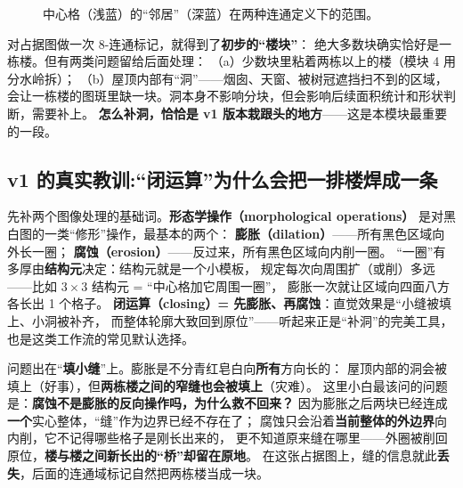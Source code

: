 \begin{figure}[H]
\centering
{}
\caption{中心格（浅蓝）的``邻居''（深蓝）在两种连通定义下的范围。}
\label{fig:conn}
\end{figure}

对占据图做一次 8-连通标记，就得到了\textbf{初步的``楼块''}：
绝大多数块确实恰好是一栋楼。但有两类问题留给后面处理：
（a）少数块里粘着两栋以上的楼（模块 4 用分水岭拆）；
（b）屋顶内部有``洞''——烟囱、天窗、被树冠遮挡扫不到的区域，
会让一栋楼的图斑里缺一块。洞本身不影响分块，但会影响后续面积统计和形状判断，需要补上。
\textbf{怎么补洞，恰恰是 v1 版本栽跟头的地方}——这是本模块最重要的一段。

\subsection{v1 的真实教训:``闭运算''为什么会把一排楼焊成一条}

先补两个图像处理的基础词。\textbf{形态学操作（morphological operations）}
是对黑白图的一类``修形''操作，最基本的两个：
\textbf{膨胀（dilation）}——所有黑色区域向外长一圈；
\textbf{腐蚀（erosion）}——反过来，所有黑色区域向内削一圈。
``一圈''有多厚由\textbf{结构元}决定：结构元就是一个小模板，
规定每次向周围扩（或削）多远——比如 $3\times3$ 结构元 = ``中心格加它周围一圈''，
膨胀一次就让区域向四面八方各长出 1 个格子。
\textbf{闭运算（closing）= 先膨胀、再腐蚀}：直觉效果是``小缝被填上、小洞被补齐，
而整体轮廓大致回到原位''——听起来正是``补洞''的完美工具，
也是这类工作流的常见默认选择。

问题出在``\textbf{填小缝}''上。膨胀是不分青红皂白向\textbf{所有}方向长的：
屋顶内部的洞会被填上（好事），但\textbf{两栋楼之间的窄缝也会被填上}（灾难）。
这里小白最该问的问题是：\textbf{腐蚀不是膨胀的反向操作吗，为什么救不回来？}
因为膨胀之后两块已经连成\textbf{一个}实心整体，``缝''作为边界已经不存在了；
腐蚀只会沿着\textbf{当前整体的外边界}向内削，它不记得哪些格子是刚长出来的，
更不知道原来缝在哪里——外圈被削回原位，\textbf{楼与楼之间新长出的``桥''却留在原地}。
在这张占据图上，缝的信息就此\textbf{丢失}，后面的连通域标记自然把两栋楼当成一块。

